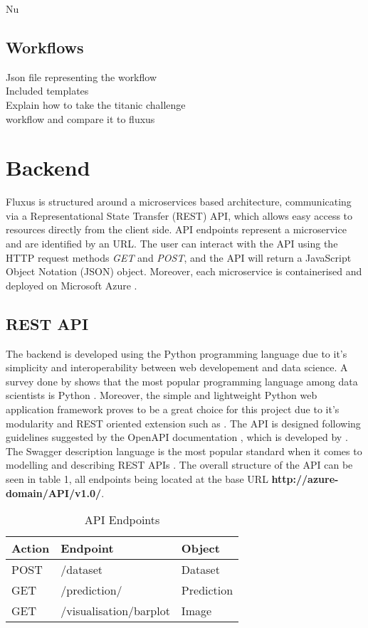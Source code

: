 Nu\documentclass[11pt,twoside, a4paper]{report}
\begin{document}
\subsection{Workflows}
Json file representing the workflow \\
Included templates \\
Explain how to take the titanic challenge \\ workflow and compare it to fluxus \\

\section{Backend}

Fluxus is structured around a microservices based architecture, communicating via a Representational State Transfer (REST) API,  which allows easy access to resources directly from the client side. API endpoints represent a microservice and are identified by an URL. The user can interact with the API using the HTTP request methods \textit{GET} and \textit{POST}, and the API will return a JavaScript Object Notation (JSON) object. Moreover, each microservice is containerised and deployed on Microsoft Azure \parencite{azure}.

\subsection{REST API}

The backend is developed using the Python programming language due to it's simplicity and interoperability between web developement and data science. A survey done by  shows that the most popular programming language among data scientists is Python \parencite{kumar_2020}. Moreover, the simple and lightweight Python web application framework  proves to be a great choice for this project due to it's modularity and REST oriented extension such as .
The API is designed following guidelines suggested by the OpenAPI documentation \cite{openapigithub}, which is developed by \cite{swagger}. The Swagger description language is the most popular standard when it comes to modelling and describing REST APIs \parencite{Haupt2017}. The overall structure of the API can be seen in table 1, all endpoints being located at the base URL \textbf{http://azure-domain/API/v1.0/}.
\begin{table}[hbt!]
\centering
\begin{tabular}{lll}
\hline
\textbf{Action} & \textbf{Endpoint}      & \textbf{Object} \\ \hline
POST            & /dataset               & Dataset         \\
GET             & /prediction/           & Prediction      \\
GET             & /visualisation/barplot & Image           \\ \hline
\end{tabular}
\caption {API Endpoints} \label{tab:title} 
\end{table}
\end{document}
